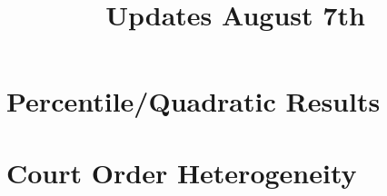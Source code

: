 \documentclass{article}
\title{Updates August 7th}
\begin{document}
\maketitle
\tableofcontents
{\footnotesize 
\listoffigures
\listoftables}
\clearpage



\section{Percentile/Quadratic Results}
\clearpage
\begin{table}
\footnotesize
\centering
\caption{Completely original percentile}
\begin{threeparttable}
\footnotesize

\end{threeparttable}
\label{tab:main_effect}
\end{table}
\clearpage

\begin{table}
\footnotesize
\centering
\caption{Percentile in our specification with imbalanced controls}
\begin{threeparttable}
\footnotesize

\end{threeparttable}
\label{tab:main_effect}
\end{table}
\clearpage

\begin{table}
\footnotesize
\centering
\caption{Percentile in our specification without imbalanced controls}
\begin{threeparttable}
\footnotesize

\end{threeparttable}
\label{tab:main_effect}
\end{table}
\clearpage

\begin{table}
\footnotesize
\centering
\caption{Quadratic Instrument}
\begin{threeparttable}
\footnotesize

\end{threeparttable}
\label{tab:main_effect}
\end{table}
\clearpage

\section{Court Order Heterogeneity}
\end{document}
